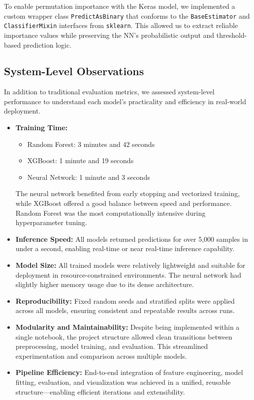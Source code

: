 \documentclass{article} %
\begin{document}
To enable permutation importance with the Keras model, we implemented a custom wrapper class \texttt{PredictAsBinary} that conforms to the \texttt{BaseEstimator} and \texttt{ClassifierMixin} interfaces from \texttt{sklearn}. This allowed us to extract reliable importance values while preserving the NN’s probabilistic output and threshold-based prediction logic.



\subsection*{System-Level Observations}

In addition to traditional evaluation metrics, we assessed system-level performance to understand each model’s practicality and efficiency in real-world deployment.

\begin{itemize}
    \item \textbf{Training Time:} 
    \begin{itemize}
        \item Random Forest: 3 minutes and 42 seconds
        \item XGBoost: 1 minute and 19 seconds
        \item Neural Network: 1 minute and 3 seconds
    \end{itemize}
    The neural network benefited from early stopping and vectorized training, while XGBoost offered a good balance between speed and performance. Random Forest was the most computationally intensive during hyperparameter tuning.

    \item \textbf{Inference Speed:} All models returned predictions for over 5,000 samples in under a second, enabling real-time or near real-time inference capability.

    \item \textbf{Model Size:} All trained models were relatively lightweight and suitable for deployment in resource-constrained environments. The neural network had slightly higher memory usage due to its dense architecture.

    \item \textbf{Reproducibility:} Fixed random seeds and stratified splits were applied across all models, ensuring consistent and repeatable results across runs.

    \item \textbf{Modularity and Maintainability:} Despite being implemented within a single notebook, the project structure allowed clean transitions between preprocessing, model training, and evaluation. This streamlined experimentation and comparison across multiple models.

    \item \textbf{Pipeline Efficiency:} End-to-end integration of feature engineering, model fitting, evaluation, and visualization was achieved in a unified, reusable structure—enabling efficient iterations and extensibility.
\end{itemize}
\end{document}
